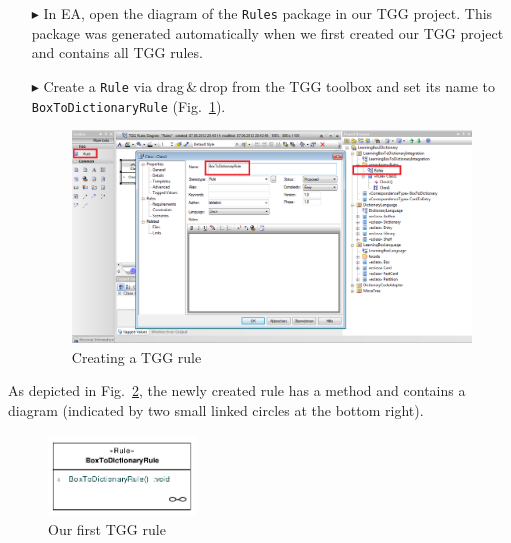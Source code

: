 \begin{enumerate}
\item[$\blacktriangleright$] In EA, open the diagram of the \texttt{Rules} package in our TGG project.
This package was generated automatically when we first created our TGG project and contains all TGG rules.

\item[$\blacktriangleright$] Create a \texttt{Rule} via drag\,\&\,drop from the TGG toolbox and set its name to \texttt{BoxToDictionaryRule} (Fig.~\ref{fig:create_tgg_rule}).

\begin{figure}[htbp]
\begin{center}
  \includegraphics[width=\textwidth]{pics/tggBilder/tggRule/tgg8}
  \caption{Creating a TGG rule}  
  \label{fig:create_tgg_rule}
\end{center}
\end{figure}

\end{enumerate}

As depicted in Fig.~\ref{fig:first_tgg_rule}, the newly created rule has a method and contains a diagram (indicated by two small linked circles at the bottom right).

\begin{figure}[htbp]
\begin{center}
  \includegraphics[width=0.35\textwidth]{pics/tggBilder/tggRule/tgg9}
  \caption{Our first TGG rule}  
  \label{fig:first_tgg_rule}
\end{center}
\end{figure}

